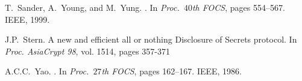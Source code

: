 \documentclass[11pt]{article}
\begin{document}
\begin{footnotesize}
\begin{thebibliography}{10}
		T.~Sander, A.~Young, and M.~Yung.
		.
		\newblock In {\em Proc.\ $40$th FOCS}, pages 554--567. IEEE, 1999.
		
		J.P.~Stern.
		\newblock A new and efficient all or nothing Disclosure of Secrets protocol.
		\newblock In {\em Proc. AsiaCrypt 98}, vol. 1514, pages 357-371
		
		A.C.C.~Yao.
		.
		\newblock In {\em Proc.\ $27$th FOCS}, pages 162--167. IEEE, 1986.
		
		
	\end{thebibliography}
	
\end{footnotesize}  
  
   
 
\end{document}

